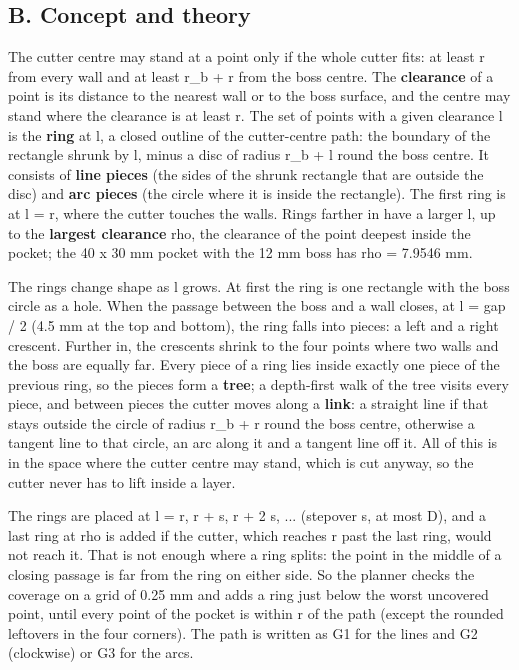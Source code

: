 \documentclass[11pt,a4paper]{article}
\begin{document}
\subsection*{B. Concept and theory}
The cutter centre may stand at a point only if the whole cutter fits: at least r from every wall and at least r\_b + r from the boss centre. The \textbf{clearance} of a point is its distance to the nearest wall or to the boss surface, and the centre may stand where the clearance is at least r. The set of points with a given clearance l is the \textbf{ring} at l, a closed outline of the cutter-centre path: the boundary of the rectangle shrunk by l, minus a disc of radius r\_b + l round the boss centre. It consists of \textbf{line pieces} (the sides of the shrunk rectangle that are outside the disc) and \textbf{arc pieces} (the circle where it is inside the rectangle). The first ring is at l = r, where the cutter touches the walls. Rings farther in have a larger l, up to the \textbf{largest clearance} rho, the clearance of the point deepest inside the pocket; the 40 x 30 mm pocket with the 12 mm boss has rho = 7.9546 mm.

The rings change shape as l grows. At first the ring is one rectangle with the boss circle as a hole. When the passage between the boss and a wall closes, at l = gap / 2 (4.5 mm at the top and bottom), the ring falls into pieces: a left and a right crescent. Further in, the crescents shrink to the four points where two walls and the boss are equally far. Every piece of a ring lies inside exactly one piece of the previous ring, so the pieces form a \textbf{tree}; a depth-first walk of the tree visits every piece, and between pieces the cutter moves along a \textbf{link}: a straight line if that stays outside the circle of radius r\_b + r round the boss centre, otherwise a tangent line to that circle, an arc along it and a tangent line off it. All of this is in the space where the cutter centre may stand, which is cut anyway, so the cutter never has to lift inside a layer.

The rings are placed at l = r, r + s, r + 2 s, ... (stepover s, at most D), and a last ring at rho is added if the cutter, which reaches r past the last ring, would not reach it. That is not enough where a ring splits: the point in the middle of a closing passage is far from the ring on either side. So the planner checks the coverage on a grid of 0.25 mm and adds a ring just below the worst uncovered point, until every point of the pocket is within r of the path (except the rounded leftovers in the four corners). The path is written as G1 for the lines and G2 (clockwise) or G3 for the arcs.
\end{document}
